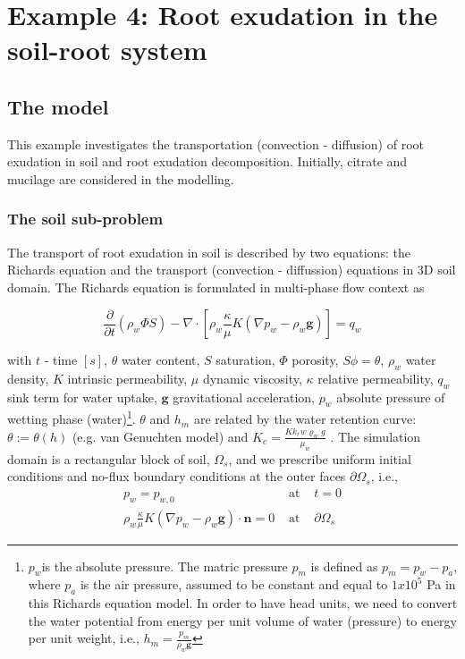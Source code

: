 \chapter*{Example 4: Root exudation in the soil-root system}

\section*{The model}
This example investigates the transportation (convection - diffusion) of root exudation in soil and
root exudation decomposition. Initially, citrate and mucilage are considered in the modelling.

\subsection*{The soil sub-problem}

The transport of root exudation in soil is described by two equations: the Richards
equation and the transport (convection - diffussion) equations in
3D soil domain. The Richards equation is formulated in multi-phase
flow context as

\[
\frac{\partial}{\partial t}\left(\rho_{w}\Phi S\right)-\nabla\cdot\left[\rho_{w}\frac{\kappa}{\mu}K\left(\nabla p_{w}-\rho_{w}\boldsymbol{g}\right)\right]=q_{w}
\]

with $t$ - time $[s]$, $\theta$ water content, $S$ saturation,
$\Phi$ porosity, $S\phi=\theta$, $\rho_{w}$ water density, $K$
intrinsic permeability, $\mu$ dynamic viscosity, $\kappa$ relative
permeability, $q_{w}$ sink term for water uptake, $\boldsymbol{g}$
gravitational acceleration, $p_{w}$ absolute pressure of wetting
phase (water)\footnote{$p_{w}$is the absolute pressure. The matric pressure $p_{m}$ is
defined as $p_{m}=p_{w}-p_{a}$, where $p_{a}$ is the air pressure,
assumed to be constant and equal to $1x10^{5}$ Pa in this Richards
equation model. In order to have head units, we need to convert the
water potential from energy per unit volume of water (pressure) to
energy per unit weight, i.e., $h_{m}=\frac{p_{m}}{\rho_{w}\boldsymbol{g}}$}. $\theta$ and $h_{m}$ are related by the water retention curve:
$\theta:=\theta(h)$ (e.g. van Genuchten model) and $K_{c}=\frac{Kk_{r}w\varrho_{w}g}{\mu_{w}}$
. The simulation domain is a rectangular block of soil, $\Omega_{s}$,
and we prescribe uniform initial conditions and no-flux boundary conditions
at the outer faces $\partial\Omega_{s}$, i.e.,
\begin{eqnarray}
p_{w}=p_{w,0} & \text{ at } & t=0\\
\rho_{w}\frac{\kappa}{\mu}K\left(\nabla p_{w}-\rho_{w}\boldsymbol{g}\right) \cdot \mathbf{n}=0 & \text{ at } & \partial\Omega_{s}
\end{eqnarray}

